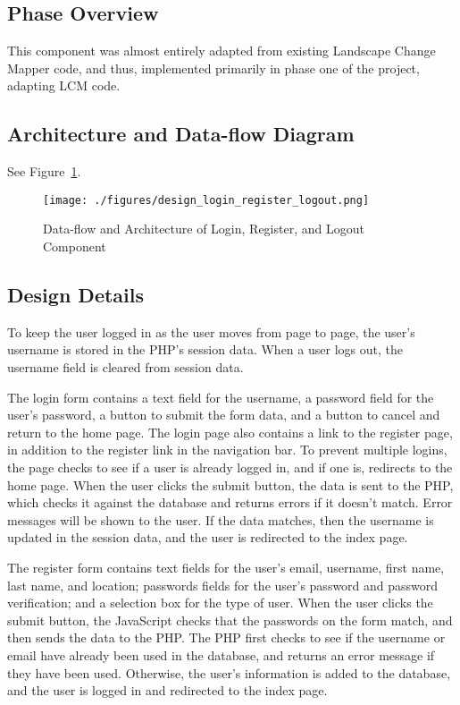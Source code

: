 \subsection{Phase Overview}
This component was almost entirely adapted from existing Landscape Change Mapper code, and thus, implemented primarily in phase one of the project, adapting LCM code. 

\subsection{ Architecture and Data-flow Diagram}
See Figure~\ref{design_login_register_logout}.
\begin{figure}[tbh]
\begin{center}
\texttt{[image: ./figures/design\_login\_register\_logout.png]}
\end{center}
\caption{Data-flow and Architecture of Login, Register, and Logout Component \label{design_login_register_logout}}
\end{figure}

\subsection{Design Details}
To keep the user logged in as the user moves from page to page, the user's username is stored in the PHP's session data. When a user logs out, the username field is cleared from session data. 

The login form contains a text field for the username, a password field for the user's password, a button to submit the form data, and a button to cancel and return to the home page. The login page also contains a link to the register page, in addition to the register link in the navigation bar.  To prevent multiple logins, the page checks to see if a user is already logged in, and if one is, redirects to the home page. When the user clicks the submit button, the data is sent to the PHP, which checks it against the database and returns errors if it doesn't match. Error messages will be shown to the user. If the data matches, then the username is updated in the session data, and the user is redirected to the index page. 

The register form contains text fields for the user's email, username, first name, last name, and location; passwords fields for the user's password and password verification; and a selection box for the type of user. When the user clicks the submit button, the JavaScript checks that the passwords on the form match, and then sends the data to the PHP. The PHP first checks to see if the username or email have already been used in the database, and returns an error message if they have been used. Otherwise, the user's information is added to the database, and the user is logged in and redirected to the index page.


